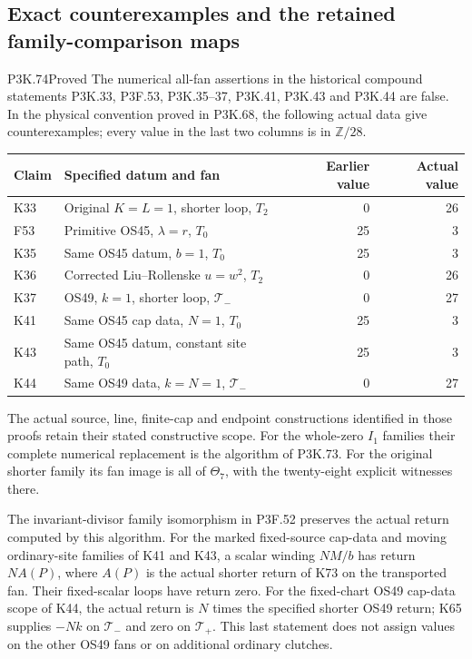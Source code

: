 \subsection{Exact counterexamples and the retained family-comparison maps}
\begin{statement}{P3K.74}{Proved}
The numerical all-fan assertions in the historical compound
statements P3K.33, P3F.53, P3K.35--37, P3K.41, P3K.43 and
P3K.44 are false. In the physical convention proved in P3K.68,
the following actual data give counterexamples; every value
in the last two columns is in \(\mathbb Z/28\).
\begin{center}\small
\begin{tabular}{llrr}
\toprule
Claim & Specified datum and fan & Earlier value & Actual value\\
\midrule
K33 & Original \(K=L=1\), shorter loop, \(T_2\)&0&26\\
F53 & Primitive OS45, \(\lambda=r\), \(T_0\)&25&3\\
K35 & Same OS45 datum, \(b=1\), \(T_0\)&25&3\\
K36 & Corrected Liu--Rollenske \(u=w^2\), \(T_2\)&0&26\\
K37 & OS49, \(k=1\), shorter loop, \(\mathcal T_-\)&0&27\\
K41 & Same OS45 cap data, \(N=1\), \(T_0\)&25&3\\
K43 & Same OS45 datum, constant site path, \(T_0\)&25&3\\
K44 & Same OS49 data, \(k=N=1\), \(\mathcal T_-\)&0&27\\
\bottomrule
\end{tabular}
\end{center}
The actual source, line, finite-cap and endpoint constructions
identified in those proofs retain their stated constructive
scope. For the whole-zero \(I_1\) families their complete
numerical replacement is the algorithm of P3K.73. For the
original shorter family its fan image is all of \(\Theta_7\),
with the twenty-eight explicit witnesses there.

The invariant-divisor family isomorphism in P3F.52 preserves
the actual return computed by this algorithm. For the marked
fixed-source cap-data and moving ordinary-site families of
K41 and K43, a scalar winding \(N M/b\) has return \(N A(P)\),
where \(A(P)\) is the actual shorter return of K73 on the
transported fan. Their fixed-scalar loops have return zero.
For the fixed-chart OS49 cap-data scope of K44, the actual
return is \(N\) times the specified shorter OS49 return;
K65 supplies \(-Nk\) on \(\mathcal T_-\) and zero on
\(\mathcal T_+\). This last statement does not assign values
on the other OS49 fans or on additional ordinary clutches.
\end{statement}
